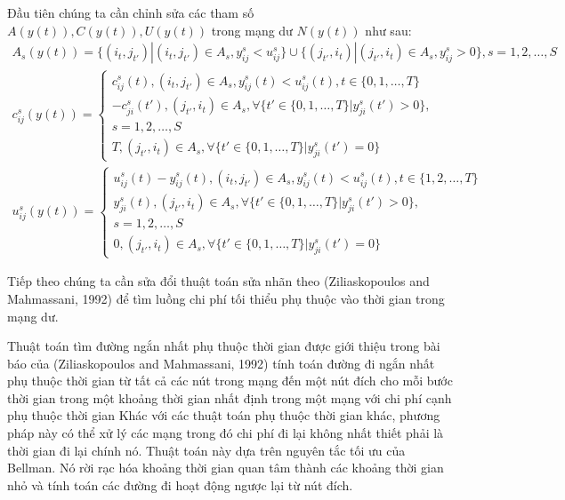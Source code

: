 \documentclass[a4paper]{article}
\begin{document}
    Đầu tiên chúng ta cần chỉnh sửa các tham số $A(y(t)), C(y(t)), U(y(t))$ trong mạng dư $N(y(t))$ như sau:
    \begin{gather*}
        A_s(y(t)) = \{(i_t,j_{t'})|(i_t,j_{t'}) \in A_s, y_{ij}^s < u_{ij}^s\} \cup \{(j_{t'},i_t)|(j_{t'},i_t) \in A_s, y_{ij}^s > 0\}, s = 1,2,\dotsc,S\\
        c_{ij}^s(y(t)) = \begin{cases}
            c_{ij}^s(t), (i_t,j_{t'}) \in A_s, y_{ij}^s(t) < u_{ij}^s(t), t \in \{0,1,\dotsc,T\}\\
            -c_{ji}^s(t'), (j_{t'},i_t) \in A_s, \forall \{ {t'} \in \{0,1,\dotsc,T\}|y_{ji}^s(t') > 0\},\\
            s = 1,2,\dotsc,S\\
            T, (j_{t'}, i_t) \in A_s, \forall \{ {t'} \in \{0,1,\dotsc,T\}|y_{ji}^s(t') = 0\}
        \end{cases}\\
        u_{ij}^s(y(t)) = \begin{cases}
            u_{ij}^s(t) - y_{ij}^s(t), (i_t,j_{t'}) \in A_s, y_{ij}^s(t) < u_{ij}^s(t), t \in \{1,2,\dotsc,T\}\\
            y_{ji}^s(t), (j_{t'},i_t) \in A_s, \forall \{ {t'} \in \{0,1,\dotsc,T\}|y_{ji}^s(t') > 0\},\\
            s = 1,2,\dotsc,S\\
            0, (j_{t'}, i_t) \in A_s, \forall \{ {t'} \in \{0,1,\dotsc,T\}|y_{ji}^s(t') = 0\}
        \end{cases}
    \end{gather*}

    Tiếp theo chúng ta cần sửa đổi thuật toán sửa nhãn theo (Ziliaskopoulos and Mahmassani, 1992) 
    để tìm luồng chi phí tối thiểu phụ thuộc vào thời gian trong mạng dư.

    Thuật toán tìm đường ngắn nhất phụ thuộc thời gian được giới thiệu trong bài báo của (Ziliaskopoulos and Mahmassani, 1992) 
    tính toán đường đi ngắn nhất phụ thuộc thời gian từ tất cả các nút trong mạng đến một nút đích cho mỗi bước thời gian trong một khoảng thời gian nhất định trong một mạng với chi phí cạnh phụ thuộc thời gian
    Khác với các thuật toán phụ thuộc thời gian khác, phương pháp này có thể xử lý các mạng trong đó chi phí đi lại không nhất thiết phải là thời gian đi lại chính nó. 
    Thuật toán này dựa trên nguyên tắc tối ưu của Bellman. 
    Nó rời rạc hóa khoảng thời gian quan tâm thành các khoảng thời gian nhỏ và tính toán các đường đi hoạt động ngược lại từ nút đích.
\end{document}
